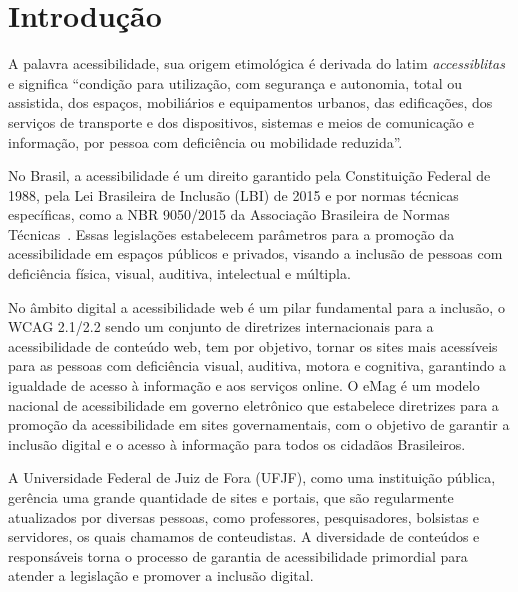 \documentclass[
	article,			%
	12pt,				%
	oneside,			%
	a4paper,			%
	section=TITLE,		%
	subsection=TITLE,	%
	english,			%
	brazil,				%
	sumario=tradicional
	]{abntex2}
\begin{document}
\textual

\section{Introdução}

A palavra acessibilidade, sua origem etimológica é derivada do latim \textit{accessiblitas}
e significa ``condição para utilização, com segurança e autonomia,
total ou assistida, dos espaços, mobiliários e equipamentos urbanos, das
edificações, dos serviços de transporte e dos dispositivos, sistemas e meios de
comunicação e informação, por pessoa com deficiência ou mobilidade reduzida''\cite{CD}.

No Brasil, a acessibilidade é um direito garantido pela Constituição
Federal de 1988, pela Lei Brasileira de Inclusão (LBI) de 2015 \cite{LBI}
e por normas técnicas específicas, como a NBR 9050/2015 da Associação
Brasileira de Normas Técnicas~\cite{ABNT}. Essas legislações estabelecem
parâmetros para a promoção da acessibilidade em espaços públicos e privados,
visando a inclusão de pessoas com deficiência física, visual, auditiva,
intelectual e múltipla.

No âmbito digital a acessibilidade web é um pilar fundamental para a
inclusão, o WCAG 2.1/2.2 \cite{wcag22} sendo um conjunto de diretrizes
internacionais para a acessibilidade de conteúdo web, tem por objetivo,
tornar os sites mais acessíveis para as pessoas com deficiência visual, auditiva,
motora e cognitiva, garantindo a igualdade de acesso à informação e aos
serviços online. O eMag é um modelo nacional de acessibilidade em governo
eletrônico que estabelece diretrizes para a promoção da acessibilidade em
sites governamentais, com o objetivo de garantir a inclusão digital e o acesso
à informação para todos os cidadãos Brasileiros.

A Universidade Federal de Juiz de Fora (UFJF), como uma instituição pública,
gerência uma grande quantidade de sites e portais, que são regularmente
atualizados por diversas pessoas, como professores, pesquisadores, bolsistas e
servidores, os quais chamamos de conteudistas. A diversidade de conteúdos e
responsáveis torna o processo de garantia de acessibilidade primordial para
atender a legislação e promover a inclusão digital.
\end{document}
